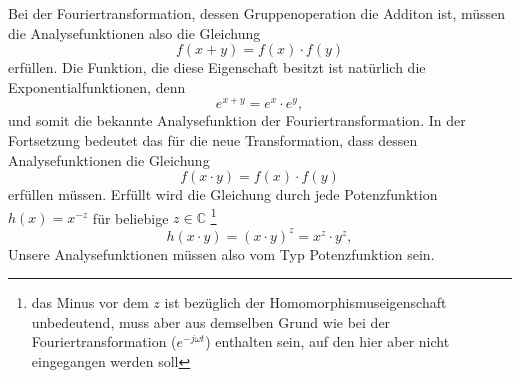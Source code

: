 Bei der Fouriertransformation, dessen Gruppenoperation die Additon ist, 
müssen die Analysefunktionen also die Gleichung 
\begin{equation}
    f(x + y) 
    = f(x) \cdot f(y)
    \label{mellin:hom1}
\end{equation}
erfüllen. 
Die Funktion, die diese Eigenschaft besitzt ist natürlich die 
Exponentialfunktionen, denn 
\begin{equation}
    e^{x + y} 
    = e^x \cdot e^y
    ,
    \label{mellin:exp}
\end{equation}
und somit die bekannte Analysefunktion der Fouriertransformation.
In der Fortsetzung bedeutet das für die neue Transformation, dass dessen 
Analysefunktionen die Gleichung
\begin{equation}
    f(x \cdot y) 
    = f(x) \cdot f(y)
    \label{mellin:hom2}
\end{equation}
erfüllen müssen.
Erfüllt wird die Gleichung durch jede Potenzfunktion $h(x) = x^{-z}$ für 
beliebige $z \in \mathbb{C}$ \footnote{das Minus vor dem $z$ ist bezüglich 
der Homomorphismuseigenschaft unbedeutend, muss aber aus demselben Grund 
wie bei der Fouriertransformation ($e^{-j\omega t}$) enthalten sein, auf 
den hier aber nicht eingegangen werden soll}
\begin{equation}
    h(x \cdot y) 
    = (x \cdot y)^{z} = x^{z} \cdot y^{z}
    ,
\end{equation}
Unsere Analysefunktionen müssen also vom Typ Potenzfunktion sein.


